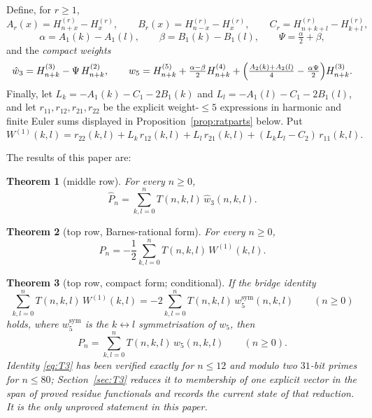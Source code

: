 \documentclass[11pt]{article}
\newtheorem{theorem}{Theorem}
\theoremstyle{remark}
\newcommand{\Hh}[2]{H_{#1}^{(#2)}}
\begin{document}
Define, for $r\ge 1$,
\[
 A_r(x)=\Hh{n+x}r-\Hh xr,\qquad
 B_r(x)=\Hh{n-x}r-\Hh xr,\qquad
 C_r=\Hh{n+k+l}r-\Hh{k+l}r,
\]
\[
 \alpha=A_1(k)-A_1(l),\qquad \beta=B_1(k)-B_1(l),\qquad \Psi=\tfrac\alpha2+\beta,
\]
and the \emph{compact weights}
\[
 \hat w_3=\Hh{n+k}3-\Psi\,\Hh{n+k}2,
\qquad
 w_5=\Hh{n+k}5+\tfrac{\alpha-\beta}2\Hh{n+k}4
 +\Bigl(\tfrac{A_2(k)+A_2(l)}4-\tfrac{\alpha\Psi}2\Bigr)\Hh{n+k}3 .
\]
Finally, let $L_k=-A_1(k)-C_1-2B_1(k)$ and $L_l=-A_1(l)-C_1-2B_1(l)$, and let
$r_{11},r_{12},r_{21},r_{22}$ be the explicit weight-$\le5$ expressions in
harmonic and finite Euler sums displayed in Proposition~\ref{prop:ratparts}
below.  Put
\begin{equation}\label{eq:W1}
 W^{(1)}(k,l)=r_{22}(k,l)+L_k\,r_{12}(k,l)+L_l\,r_{21}(k,l)
 +(L_kL_l-C_2)\,r_{11}(k,l).
\end{equation}

The results of this paper are:

\begin{theorem}[middle row]\label{thm:middle}
For every $n\ge0$,
\[
 \hat P_n=\sum_{k,l=0}^{n}T(n,k,l)\,\hat w_3(n,k,l).
\]
\end{theorem}

\begin{theorem}[top row, Barnes-rational form]\label{thm:anchor}
For every $n\ge0$,
\[
 P_n=-\frac12\sum_{k,l=0}^{n}T(n,k,l)\,W^{(1)}(k,l).
\]
\end{theorem}

\begin{theorem}[top row, compact form; conditional]\label{thm:top}
If the bridge identity
\begin{equation}\label{eq:T3}
 \sum_{k,l=0}^{n}T(n,k,l)\,W^{(1)}(k,l)
 =-2\sum_{k,l=0}^{n}T(n,k,l)\,w_5^{\mathrm{sym}}(n,k,l)
 \qquad(n\ge0)
\end{equation}
holds, where $w_5^{\mathrm{sym}}$ is the $k\leftrightarrow l$ symmetrisation
of $w_5$, then
\[
 P_n=\sum_{k,l=0}^{n}T(n,k,l)\,w_5(n,k,l)\qquad (n\ge 0).
\]
Identity \eqref{eq:T3} has been verified exactly for $n\le12$ and modulo two
$31$-bit primes for $n\le80$; Section~\ref{sec:T3} reduces it to membership
of one explicit vector in the span of proved residue functionals and records
the current state of that reduction.  It is the only unproved statement in
this paper.
\end{theorem}
\end{document}
